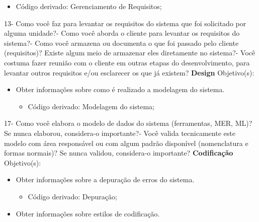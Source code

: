 \begin{anexosenv}
\begin{itemize}
\begin{itemize}
\item Código derivado: Gerenciamento de Requisitos;
\end{itemize}
\end{itemize}
    13- Como você faz para levantar os requisitos do sistema que foi solicitado por alguma unidade?- Como você aborda o cliente para levantar os requisitos do sistema?- Como você armazena ou documenta o que foi passado pelo cliente (requisitos)? Existe algum meio de armazenar eles diretamente no sistema?- Você costuma fazer reunião com o cliente em outras etapas do desenvolvimento, para levantar outros requisitos e/ou esclarecer os que já existem?\newline\newline\newline\newline
\textbf{Design}\newline\newline
Objetivo(s):
\begin{itemize}
\item Obter informações sobre como é realizado a modelagem do sistema.
\begin{itemize}
\item Código derivado: Modelagem do sistema;
\end{itemize}
\end{itemize}
    17- Como você elabora o modelo de dados do sistema (ferramentas, MER, ML)? Se nunca elaborou, considera-o importante?- Você valida tecnicamente este modelo com área responsável ou com algum padrão disponível (nomenclatura e formas normais)? Se nunca validou, considera-o importante?\newline
\newline
\textbf{Codificação}\newline\newline
Objetivo(s):
\begin{itemize}
\item Obter informações sobre a depuração de erros do sistema.
\begin{itemize}
\item Código derivado: Depuração;
\end{itemize}
\item Obter informações sobre estilos de codificação.

\end{itemize}
\end{anexosenv}
